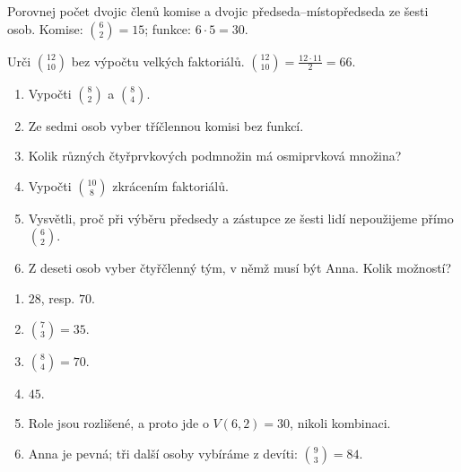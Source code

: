\documentclass[11pt,a4paper]{article}
\begin{document}
\begin{zadaniReseniBox}[title={Samostatná práce 3}]
Porovnej počet dvojic členů komise a dvojic předseda--místopředseda ze šesti osob.
\tcblower
Komise: $\binom62=15$; funkce: $6\cdot5=30$.
\end{zadaniReseniBox}




\begin{zadaniReseniBox}[title={Rozšíření 1}]
Urči $\binom{12}{10}$ bez výpočtu velkých faktoriálů.
\tcblower
$\binom{12}{10}=\frac{12\cdot11}{2}=66$.
\end{zadaniReseniBox}





\begin{zadaniReseniBox}[title={Domácí úkol}]

\begin{enumerate}[label=\alph*),leftmargin=*,itemsep=2pt]

\item Vypočti $\binom82$ a $\binom84$.
\item Ze sedmi osob vyber tříčlennou komisi bez funkcí.
\item Kolik různých čtyřprvkových podmnožin má osmiprvková množina?
\item Vypočti $\binom{10}{8}$ zkrácením faktoriálů.
\item Vysvětli, proč při výběru předsedy a zástupce ze šesti lidí nepoužijeme přímo $\binom62$.
\item Z deseti osob vyber čtyřčlenný tým, v němž musí být Anna. Kolik možností?

\end{enumerate}

\tcblower

\begin{enumerate}[label=\alph*),leftmargin=*,itemsep=2pt]

\item $28$, resp. $70$.
\item $\binom73=35$.
\item $\binom84=70$.
\item $45$.
\item Role jsou rozlišené, a proto jde o $V(6,2)=30$, nikoli kombinaci.
\item Anna je pevná; tři další osoby vybíráme z devíti: $\binom93=84$.

\end{enumerate}

\end{zadaniReseniBox}

\end{document}
